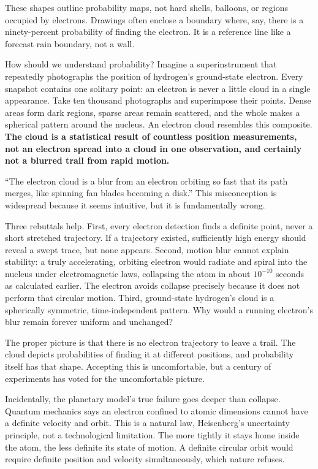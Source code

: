 These shapes outline probability maps, not hard shells, balloons, or regions occupied by electrons. Drawings often enclose a boundary where, say, there is a ninety-percent probability of finding the electron. It is a reference line like a forecast rain boundary, not a wall.

How should we understand probability? Imagine a superinstrument that repeatedly photographs the position of hydrogen's ground-state electron. Every snapshot contains one solitary point: an electron is never a little cloud in a single appearance. Take ten thousand photographs and superimpose their points. Dense areas form dark regions, sparse areas remain scattered, and the whole makes a spherical pattern around the nucleus. An electron cloud resembles this composite. \textbf{The cloud is a statistical result of countless position measurements, not an electron spread into a cloud in one observation, and certainly not a blurred trail from rapid motion.}

\begin{wuqu}
``The electron cloud is a blur from an electron orbiting so fast that its path merges, like spinning fan blades becoming a disk.'' This misconception is widespread because it seems intuitive, but it is fundamentally wrong.

Three rebuttals help. First, every electron detection finds a definite point, never a short stretched trajectory. If a trajectory existed, sufficiently high energy should reveal a swept trace, but none appears. Second, motion blur cannot explain stability: a truly accelerating, orbiting electron would radiate and spiral into the nucleus under electromagnetic laws, collapsing the atom in about $10^{-10}$ seconds as calculated earlier. The electron avoids collapse precisely because it does not perform that circular motion. Third, ground-state hydrogen's cloud is a spherically symmetric, time-independent pattern. Why would a running electron's blur remain forever uniform and unchanged?

The proper picture is that there is no electron trajectory to leave a trail. The cloud depicts probabilities of finding it at different positions, and probability itself has that shape. Accepting this is uncomfortable, but a century of experiments has voted for the uncomfortable picture.
\end{wuqu}

Incidentally, the planetary model's true failure goes deeper than collapse. Quantum mechanics says an electron confined to atomic dimensions cannot have a definite velocity and orbit. This is a natural law, Heisenberg's uncertainty principle, not a technological limitation. The more tightly it stays home inside the atom, the less definite its state of motion. A definite circular orbit would require definite position and velocity simultaneously, which nature refuses.

